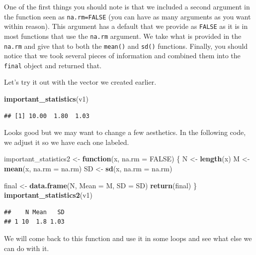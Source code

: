 \documentclass[]{tufte-book}
\newenvironment{Shaded}{}{}
\newcommand{\KeywordTok}[1]{\textcolor[rgb]{0.00,0.44,0.13}{\textbf{#1}}}
\newcommand{\DataTypeTok}[1]{\textcolor[rgb]{0.56,0.13,0.00}{#1}}
\newcommand{\StringTok}[1]{\textcolor[rgb]{0.25,0.44,0.63}{#1}}
\newcommand{\OtherTok}[1]{\textcolor[rgb]{0.00,0.44,0.13}{#1}}
\newcommand{\ControlFlowTok}[1]{\textcolor[rgb]{0.00,0.44,0.13}{\textbf{#1}}}
\newcommand{\NormalTok}[1]{#1}
\theoremstyle{definition}
\theoremstyle{definition}
\theoremstyle{remark}
\begin{document}
One of the first things you should note is that we included a second
argument in the function seen as \texttt{na.rm=FALSE} (you can have as
many arguments as you want within reason). This argument has a default
that we provide as \texttt{FALSE} as it is in most functions that use
the \texttt{na.rm} argument. We take what is provided in the
\texttt{na.rm} and give that to both the \texttt{mean()} and
\texttt{sd()} functions. Finally, you should notice that we took several
pieces of information and combined them into the \texttt{final} object
and returned that.

Let's try it out with the vector we created earlier.

\begin{Shaded}
\begin{Highlighting}[]
\KeywordTok{important_statistics}\NormalTok{(v1)}
\end{Highlighting}
\end{Shaded}

\begin{verbatim}
## [1] 10.00  1.80  1.03
\end{verbatim}

Looks good but we may want to change a few aesthetics. In the following
code, we adjust it so we have each one labeled.

\begin{Shaded}
\begin{Highlighting}[]
\NormalTok{important_statistics2 <-}\StringTok{ }\ControlFlowTok{function}\NormalTok{(x, }\DataTypeTok{na.rm =} \OtherTok{FALSE}\NormalTok{) \{}
\NormalTok{    N <-}\StringTok{ }\KeywordTok{length}\NormalTok{(x)}
\NormalTok{    M <-}\StringTok{ }\KeywordTok{mean}\NormalTok{(x, }\DataTypeTok{na.rm =}\NormalTok{ na.rm)}
\NormalTok{    SD <-}\StringTok{ }\KeywordTok{sd}\NormalTok{(x, }\DataTypeTok{na.rm =}\NormalTok{ na.rm)}
    
\NormalTok{    final <-}\StringTok{ }\KeywordTok{data.frame}\NormalTok{(N, }\DataTypeTok{Mean =}\NormalTok{ M, }\DataTypeTok{SD =}\NormalTok{ SD)}
    \KeywordTok{return}\NormalTok{(final)}
\NormalTok{\}}
\KeywordTok{important_statistics2}\NormalTok{(v1)}
\end{Highlighting}
\end{Shaded}

\begin{verbatim}
##    N Mean   SD
## 1 10  1.8 1.03
\end{verbatim}

We will come back to this function and use it in some loops and see what
else we can do with it.
\end{document}
